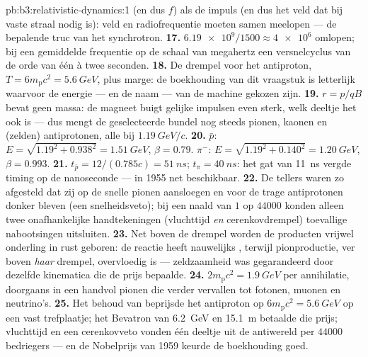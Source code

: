 \begin{solution}{pb:b3:relativistic-dynamics:1}
(en dus $f$) als de impuls (en dus het veld dat bij vaste straal nodig
is): veld en radiofrequentie moeten samen meelopen --- de bepalende truc
van het synchrotron.
\textbf{17.} $\num{6.19e9}/1500 \approx \num{4e6}$ omlopen; bij een
gemiddelde frequentie op de schaal van megahertz een versnelcyclus van
de orde van één à twee seconden.
\textbf{18.} De drempel voor het antiproton, $T = 6m_{\text{p}}c^2 =
\qty{5.6}{GeV}$, plus marge: de boekhouding van dit vraagstuk is
letterlijk waarvoor de energie --- en de naam --- van de machine gekozen
zijn.
\textbf{19.} $r = p/qB$ bevat geen massa: de magneet buigt gelijke
impulsen even sterk, welk deeltje het ook is --- dus mengt de
geselecteerde bundel nog steeds pionen, kaonen en (zelden) antiprotonen,
alle bij $\qty{1.19}{GeV}/c$.
\textbf{20.} $\bar p$: $E = \sqrt{1.19^2 + 0.938^2} =
\qty{1.51}{GeV}$, $\beta = 0.79$. $\pi^-$: $E = \sqrt{1.19^2 +
0.140^2} = \qty{1.20}{GeV}$, $\beta = 0.993$.
\textbf{21.} $t_{\bar p} = 12/(0.785c) = \qty{51}{ns}$; $t_\pi =
\qty{40}{ns}$: het gat van \qty{11}{ns} vergde timing op de nanoseconde
--- in 1955 net beschikbaar.
\textbf{22.} De tellers waren zo afgesteld dat zij op de snelle pionen
aansloegen en voor de trage antiprotonen donker bleven (een
snelheidsveto); bij een naald van $1$ op $44000$ konden alleen twee
onafhankelijke handtekeningen (vluchttijd \emph{en} cerenkovdrempel)
toevallige nabootsingen uitsluiten.
\textbf{23.} Net boven de drempel worden de producten vrijwel onderling
in rust geboren: de reactie heeft nauwelijks , terwijl
pionproductie, ver boven \emph{haar} drempel, overvloedig is ---
zeldzaamheid was gegarandeerd door dezelfde kinematica die de prijs
bepaalde.
\textbf{24.} $2m_{\text{p}}c^2 = \qty{1.9}{GeV}$ per annihilatie,
doorgaans in een handvol pionen die verder vervallen tot fotonen, muonen
en neutrino's.
\textbf{25.} Het behoud van  beprijsde het antiproton op
$6m_{\text{p}}c^2 = \qty{5.6}{GeV}$ op een vast trefplaatje; het
Bevatron van \qty{6.2}{GeV} en \qty{15.1}{m} betaalde die prijs;
vluchttijd en een cerenkovveto vonden één deeltje uit de antiwereld per
$44000$ bedriegers --- en de Nobelprijs van 1959 keurde de boekhouding
goed.
\end{solution}
